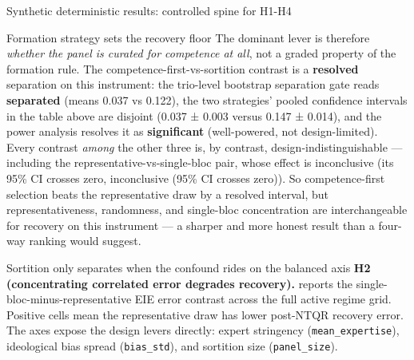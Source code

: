 \documentclass[
  ignorenonframetext,
]{beamer}
\begin{document}
\begin{frame}{Synthetic deterministic results:
controlled spine for H1-H4}
\begin{block}{Formation strategy sets the recovery floor}
The dominant lever is therefore \emph{whether the panel is curated for
competence at all}, not a graded property of the formation rule. The
competence-first-vs-sortition contrast is a \textbf{resolved} separation
on this instrument: the trio-level bootstrap separation gate reads
\textbf{separated} (means 0.037 vs 0.122), the two strategies' pooled
confidence intervals in the table above are disjoint (0.037 ± 0.003
versus 0.147 ± 0.014), and the power analysis resolves it as
\textbf{significant} (well-powered, not design-limited). Every contrast
\emph{among} the other three is, by contrast, design-indistinguishable
--- including the representative-vs-single-bloc pair, whose effect is
inconclusive (its 95\% CI crosses zero, inconclusive (95\% CI crosses
zero)). So competence-first selection beats the representative draw by a
resolved interval, but representativeness, randomness, and single-bloc
concentration are interchangeable for recovery on this instrument --- a
sharper and more honest result than a four-way ranking would suggest.
\end{block}

\begin{block}{Sortition only separates when the confound rides on the
balanced axis}
\protect{}\label{sortition-only-separates-when-the-confound-rides-on-the-balanced-axis}
\textbf{H2 (concentrating correlated error degrades recovery).}
 reports the single-bloc-minus-representative EIE
error contrast across the full active regime grid. Positive cells mean
the representative draw has lower post-NTQR recovery error. The axes
expose the design levers directly: expert stringency
(\texttt{mean\_expertise}), ideological bias spread
(\texttt{bias\_std}), and sortition size (\texttt{panel\_size}).


\end{block}
\end{frame}
\end{document}
